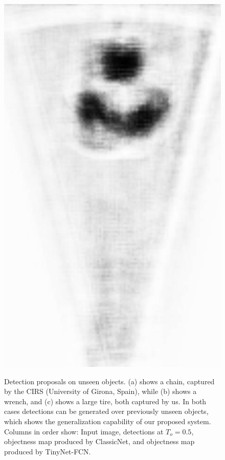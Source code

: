 \begin{figure}[!t]
{		\includegraphics[height=0.2\textheight]{chapters/images/proposals/unseen/large-tire-fcn.jpg}
	}
	\vspace*{0.5cm}
    \forceversofloat
	\caption[Detection proposals on unseen objects (cont)]{Detection proposals on unseen objects. (a) shows a chain, captured by the CIRS (University of Girona, Spain), while (b) shows a wrench, and (c) shows a large tire, both captured by us. In both cases detections can be generated over previously unseen objects, which shows the generalization capability of our proposed system. Columns in order show: Input image, detections at $T_o = 0.5$, objectness map produced by ClassicNet, and objectness map produced by TinyNet-FCN.}
	\label{proposals:unseenObjectsOne}
\end{figure}

